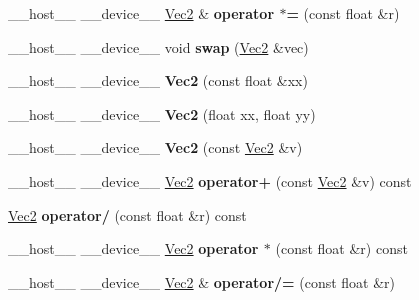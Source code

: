 \begin{DoxyCompactItemize}
\item 
\+\_\+\+\_\+host\+\_\+\+\_\+ \+\_\+\+\_\+device\+\_\+\+\_\+ \hyperlink{class_vec2}{Vec2} \& {\bfseries operator $\ast$=} (const float \&r)\hypertarget{class_vec2_ab7f2a84b847c04690ddd7823144ae591}{}\label{class_vec2_ab7f2a84b847c04690ddd7823144ae591}

\item 
\+\_\+\+\_\+host\+\_\+\+\_\+ \+\_\+\+\_\+device\+\_\+\+\_\+ void {\bfseries swap} (\hyperlink{class_vec2}{Vec2} \&vec)\hypertarget{class_vec2_a45e2ef0b091128f3d78fc691b862cdef}{}\label{class_vec2_a45e2ef0b091128f3d78fc691b862cdef}

\item 
\+\_\+\+\_\+host\+\_\+\+\_\+ \+\_\+\+\_\+device\+\_\+\+\_\+ {\bfseries Vec2} (const float \&xx)\hypertarget{class_vec2_a33d3d56000bb864e5d30eb48f1685695}{}\label{class_vec2_a33d3d56000bb864e5d30eb48f1685695}

\item 
\+\_\+\+\_\+host\+\_\+\+\_\+ \+\_\+\+\_\+device\+\_\+\+\_\+ {\bfseries Vec2} (float xx, float yy)\hypertarget{class_vec2_aa39cf936ef3699647eb72ef76f6ce97d}{}\label{class_vec2_aa39cf936ef3699647eb72ef76f6ce97d}

\item 
\+\_\+\+\_\+host\+\_\+\+\_\+ \+\_\+\+\_\+device\+\_\+\+\_\+ {\bfseries Vec2} (const \hyperlink{class_vec2}{Vec2} \&v)\hypertarget{class_vec2_a0dfcf0539532615ae5b37a4d2995253d}{}\label{class_vec2_a0dfcf0539532615ae5b37a4d2995253d}

\item 
\+\_\+\+\_\+host\+\_\+\+\_\+ \+\_\+\+\_\+device\+\_\+\+\_\+ \hyperlink{class_vec2}{Vec2} {\bfseries operator+} (const \hyperlink{class_vec2}{Vec2} \&v) const\hypertarget{class_vec2_a71daf354e7f2dc8acd0f4ccb33e2d77b}{}\label{class_vec2_a71daf354e7f2dc8acd0f4ccb33e2d77b}

\item 
\hyperlink{class_vec2}{Vec2} {\bfseries operator/} (const float \&r) const\hypertarget{class_vec2_a71b95a0b8cb412cf5d7fc52b53dc8e47}{}\label{class_vec2_a71b95a0b8cb412cf5d7fc52b53dc8e47}

\item 
\+\_\+\+\_\+host\+\_\+\+\_\+ \+\_\+\+\_\+device\+\_\+\+\_\+ \hyperlink{class_vec2}{Vec2} {\bfseries operator $\ast$} (const float \&r) const\hypertarget{class_vec2_a3eae44cc4053ef70be638d4d4202fe72}{}\label{class_vec2_a3eae44cc4053ef70be638d4d4202fe72}

\item 
\+\_\+\+\_\+host\+\_\+\+\_\+ \+\_\+\+\_\+device\+\_\+\+\_\+ \hyperlink{class_vec2}{Vec2} \& {\bfseries operator/=} (const float \&r)\hypertarget{class_vec2_a622c47d2f678a364b2cc6d09a453cfd6}{}\label{class_vec2_a622c47d2f678a364b2cc6d09a453cfd6}


\end{DoxyCompactItemize}
